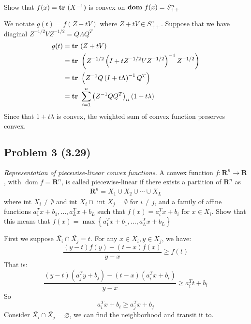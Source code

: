 \documentclass[en,hazy,blue,10pt,device = normal]{elegantnote}
\begin{document}
\begin{center}
    Show that \(f(x) = {\textbf{tr}\ }(X^{-1})\) is convex on \({\textbf{dom}\ } f(x) = S_{++}^n\)
\end{center}

\begin{tcolorbox}
    \sol

    We notate \(g(t) = f(Z+tV)\) where \(Z+tV \in S_{++}^n\). Suppose that we have diaginal \(Z^{-1/2}V Z^{-1/2} = Q\Lambda Q^T\)
    \begin{align*}
        g(t) &= {\textbf{tr}\ } (Z + tV)\\
        &= {\textbf{tr}\ } \left( Z^{-1/2} \left( I + tZ^{-1/2}V Z^{-1/2} \right)^{-1} Z^{-1/2} \right) \\
        &= {\textbf{tr}\ } \left( Z^{-1}Q\left( I + t\Lambda  \right)^{-1} Q^T \right) \\
        &= {\textbf{tr}\ } \sum_{i=1}^{n} \left( Z^{-1}Q Q^T  \right)_{ii}(1+t \lambda )
    \end{align*}
    Since that \(1+t\lambda\) is convex, the weighted sum of convex function preserves convex.
\end{tcolorbox}

\subsection*{Problem 3 (3.29)}
\textit{Representation of piecewise-linear convex functions.} A convex function \(f: \mathbf{R}^n \rightarrow \mathbf{R}\), with \(\operatorname{dom} f=\mathbf{R}^n\), is called piecewise-linear if there exists a partition of \(\mathbf{R}^n\) as
\begin{align*}
\mathbf{R}^n=X_1 \cup X_2 \cup \cdots \cup X_L
\end{align*}
where int \(X_i \neq \emptyset\) and int \(X_i \cap\) int \(X_j=\emptyset\) for \(i \neq j\), and a family of affine functions \(a_1^T x+b_1, \ldots, a_L^T x+b_L\) such that \(f(x)=a_i^T x+b_i\) for \(x \in X_i\).
Show that this means that \(f(x)=\max \left\{a_1^T x+b_1, \ldots, a_L^T x+b_L\right\}\)

\begin{tcolorbox}
    \sol

    First we suppose \(\overline{X_i}\cap \overline{X_j } = t\). For any \(x \in X_i, y \in X_j \), we have:
    \[\frac{(y-t)f(y) - (t-x)f(x)}{y-x} \geq f(t)\]
    That is:
    \[\frac{(y-t)(a_j^T y +b_j ) - (t-x)(a_i^T x +b_i)}{y-x} \geq a_i ^T t + b_i\]
    So \[a_i ^T x + b_i \geq a_j^T x +b_j\]
    Consider \(\overline{X_i}\cap \overline{X_j } = \varnothing\), we can find the neighborhood and transit it to.
\end{tcolorbox}
\end{document}
